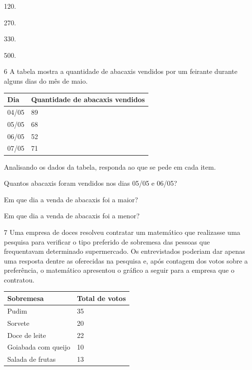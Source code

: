 \begin{minipage}{.5\textwidth}
\begin{escolha}
\item
  120.
\item
  270.
\item
  330.
\item
  500.
\end{escolha}
\end{minipage}

\num{6} A tabela mostra a quantidade de abacaxis vendidos por um feirante
durante alguns dias do mês de maio.

\begin{longtable}[]{@{}ll@{}}
\toprule
Dia & Quantidade de abacaxis vendidos\tabularnewline
\midrule
\endhead
04/05 & 89\tabularnewline
05/05 & 68\tabularnewline
06/05 & 52\tabularnewline
07/05 & 71\tabularnewline
\bottomrule
\end{longtable}

Analisando os dados da tabela, responda ao que se pede em cada item.

\begin{escolha}
\item Quantos abacaxis foram vendidos nos dias 05/05 e 06/05?

\item Em que dia a venda de abacaxis foi a maior?

\item Em que dia a venda de abacaxis foi a menor?
\end{escolha}

\num{7} Uma empresa de doces resolveu contratar um matemático que realizasse uma
pesquisa para verificar o tipo preferido de sobremesa das pessoas que
frequentavam determinado supermercado. Os entrevistados poderiam dar
apenas uma resposta dentre as oferecidas na pesquisa e, após contagem dos
votos sobre a preferência, o matemático apresentou o gráfico a seguir
para a empresa que o contratou.

\begin{longtable}[]{@{}ll@{}}
\toprule
Sobremesa & Total de votos\tabularnewline
\midrule
\endhead
Pudim & 35\tabularnewline
Sorvete & 20\tabularnewline
Doce de leite & 22\tabularnewline
Goiabada com queijo & 10\tabularnewline
Salada de frutas & 13\tabularnewline
\bottomrule
\end{longtable}

